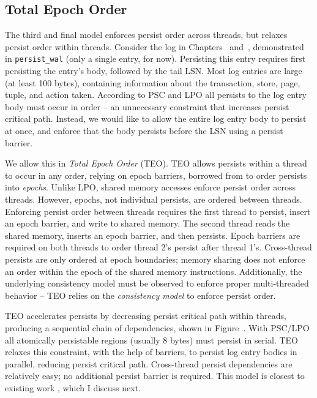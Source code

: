 \subsection{Total Epoch Order}
\label{sec:PMC:PersistenceModels:TEO}

The third and final model enforces persist order across threads, but relaxes persist order within threads.
Consider the log in Chapters~ and~, demonstrated in \texttt{persist\_wal} (only a single entry, for now).
Persisting this entry requires first persisting the entry's body, followed by the tail LSN.
Most log entries are large (at least 100 bytes), containing information about the transaction, store, page, tuple, and action taken.
According to PSC and LPO all persists to the log entry body must occur in order -- an unnecessary constraint that increases persist critical path.
Instead, we would like to allow the entire log entry body to persist at once, and enforce that the body persists before the LSN using a persist barrier.

We allow this in \emph{Total Epoch Order} (TEO).
TEO allows persists within a thread to occur in any order, relying on epoch barriers, borrowed from  to order persists into \emph{epochs}.
Unlike LPO, shared memory accesses enforce persist order across threads.
However, epochs, not individual persists, are ordered between threads.
Enforcing persist order between threads requires the first thread to persist, insert an epoch barrier, and write to shared memory.
The second thread reads the shared memory, inserts an epoch barrier, and then persists.
Epoch barriers are required on both threads to order thread 2's persist after thread 1's.
Cross-thread persists are only ordered at epoch boundaries; memory sharing does not enforce an order within the epoch of the shared memory instructions.
Additionally, the underlying consistency model must be observed to enforce proper multi-threaded behavior -- TEO relies on the \emph{consistency model} to enforce persist order.



TEO accelerates persists by decreasing persist critical path within threads, producing a sequential chain of dependencies, shown in Figure~.
With PSC/LPO all atomically persistable regions (usually 8 bytes) must persist in serial.
TEO relaxes this constraint, with the help of barriers, to persist log entry bodies in parallel, reducing persist critical path.
Cross-thread persist dependencies are relatively easy; no additional persist barrier is required.
This model is closest to existing work , which I discuss next.

